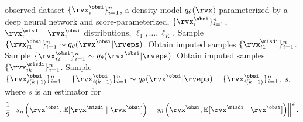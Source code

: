 \begin{algorithm}[tb]
	\caption{Multilevel Monte Carlo}
	\label{alg:multilevel}
	\begin{algorithmic}[1]
		\REQUIRE observed dataset $\{\rvx_{i}^{\obsi}\}_{i=1}^{n}$, a density model $q_{\theta}(\rvx)$ parameterized by a deep neural network and score-parameterized, $\{\rvx_{i}^{\obsi}\}_{i=1}^{n}$, $\rvx_{i}^{\misdi} \mid \rvx_{i}^{\obsi}$ distributions, $\ell_{1}, \ldots, \ell_{K}$.
		\STATE Sample $\{\rvx_{i1}^{\obsi}\}_{i=1}^{n} \sim q_{\theta}(\rvx^{\obsi} | \rveps)$.
		\STATE Obtain imputed samples $\{\rvx_{i1}^{\misdi}\}_{i=1}^{n}$.
		\STATE Sample $\{\rvx_{i2}^{\obsi}\}_{i=1}^{n} \sim q_{\theta}(\rvx^{\obsi} | \rveps)$.
		\STATE Obtain imputed samples $\{\rvx_{ik}^{\misdi}\}_{i=1}^{n}$.
		\STATE Sample $\{\rvx_{i(k+1)}^{\obsi}\}_{i=1}^{n} - \{\rvx_{i(k-1)}^{\obsi}\}_{i=1}^{n} \sim q_{\theta}(\rvx^{\obsi} | \rveps) - \{\rvx_{i(k-1)}^{\obsi}\}_{i=1}^{n}$.
		\ENDFOR
		\RETURN $s$, where $s$ is an estimator for 
		\begin{align*}
			\frac{1}{2} \left\| s_{\eta} \left( \rvx^{\obsi}, \mathbb{E}[\rvx^{\misdi} \mid \rvx^{\obsi}] \right) - s_{\theta} \left( \rvx^{\obsi}, \mathbb{E}[\rvx^{\misdi} \mid \rvx^{\obsi}] \right) \right\|^{2}.
		\end{align*} 
	\end{algorithmic}
\end{algorithm}

